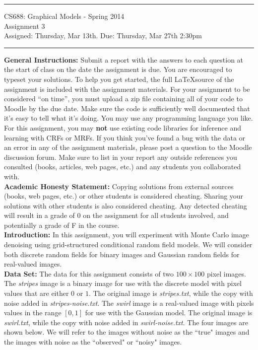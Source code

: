 \documentclass[11pt]{article}
\newcommand{\discrete}{stripes}
\newcommand{\gaussian}{swirl}
\begin{document}
{\centering
  \rule{6.3in}{2pt}
  \vspace{1em}
  {\Large
    CS688: Graphical Models - Spring 2014\\
    Assignment 3\\
  }
  \vspace{1em}
  Assigned: Thursday, Mar 13th. Due: Thursday, Mar 27th 2:30pm\\
  \vspace{0.1em}
  \rule{6.3in}{1.5pt}
}\vspace{1em}

\textbf{General Instructions:} Submit a report with the answers to each question at the start of class on the date the assignment is due. You are encouraged to typeset your solutions. To help you get started, the full \LaTeX source of the assignment is included with the assignment materials. For your assignment to be considered ``on time'', you must upload a zip file containing all of your code to Moodle by the due date. Make sure the code is sufficiently well documented that it's easy to tell what it's doing. You may use any programming language you like. For this assignment, you may \textbf{not} use existing code libraries for inference and learning with CRFs or MRFs. If you think you've found a bug with the data or an error in any of the assignment materials, please post a question to the Moodle discussion forum. Make sure to list in your report any outside references you consulted (books, articles, web pages, etc.) and any students you collaborated with.\\

\textbf{Academic Honesty Statement:} Copying solutions from external sources (books, web pages, etc.) or other students is considered cheating. Sharing your solutions with other students is also considered cheating. Any detected cheating will result in a grade of 0 on the assignment for all students involved, and potentially a grade of F in the course.\\

\textbf{Introduction:} In this assignment, you will experiment with Monte Carlo image denoising using grid-structured conditional random field models. We will consider both discrete random fields for binary images and Gaussian random fields for real-valued images.\\

\textbf{Data Set:} The data for this assignment consists of two $100 \times 100$ pixel images. The \textit{\discrete} image is a binary image for use with the discrete model with pixel values that are either $0$ or $1$. The original image is \textit{\discrete.txt}, while the copy with noise added in \textit{\discrete-noise.txt}. The \textit{\gaussian} image is a real-valued image with pixels values in the range $[0,1]$ for use with the Gaussian model. The original image is \textit{\gaussian.txt}, while the copy with noise added in \textit{\gaussian-noise.txt}.
The four images are shown below. We will refer to the images without noise as the ``true" images and the images with noise as the ``observed" or ``noisy" images.
\end{document}
